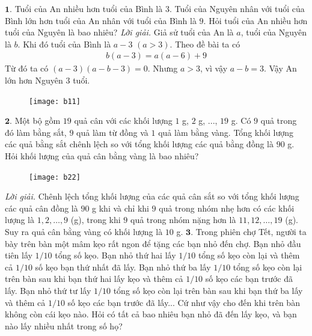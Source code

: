 \begin{multicols}{2}
$\pmb{1.}$ Tuổi của An nhiều hơn tuổi của Bình là $3$. Tuổi của Nguyên nhân với tuổi của Bình    lớn hơn   tuổi của An nhân với tuổi của Bình là  $9$. Hỏi tuổi của An nhiều hơn tuổi của Nguyên là bao nhiêu?
\vskip 0.1cm
\textit{Lời giải.} Giả sử tuổi của An là $a$, tuổi của Nguyên là $b$. Khi đó tuổi của Bình là $a - 3$ $(a>3)$. Theo đề bài ta có
\begin{align*}
	b(a-3) = a(a-6)+9
\end{align*}
Từ đó ta có $(a-3)(a-b-3)=0$.
\vskip 0.1cm
Nhưng $a>3$, vì vậy $a-b=3$. Vậy An lớn hơn Nguyên $3$ tuổi.
\begin{figure}[H]
	\centering
	\vspace*{-5pt}
	\captionsetup{labelformat= empty, justification=centering}
	\texttt{[image: b11]}
	\vspace*{-15pt}
\end{figure}
$\pmb{2.}$ Một bộ gồm $19$ quả cân với các khối lượng $1$ g, $2$ g, ..., $19$ g. Có $9$ quả trong đó làm bằng sắt, $9$ quả làm từ đồng và $1$ quả làm bằng vàng. Tổng khối lượng các quả bằng sắt \linebreak chênh lệch so với tổng khối lượng các quả bằng đồng là $90$ g. Hỏi khối lượng của quả cân bằng vàng là bao nhiêu?
\begin{figure}[H]
	\centering
	\vspace*{-5pt}
	\captionsetup{labelformat= empty, justification=centering}
	\texttt{[image: b22]}
	\vspace*{-15pt}
\end{figure}
\textit{Lời giải.} Chênh lệch tổng khối lượng của các quả cân sắt so với  tổng khối lượng các quả cân đồng là $90$ g khi và chỉ khi $9$ quả trong nhóm nhẹ hơn có các khối lượng là $1, 2, \ldots, 9$ (g), trong khi $9$ quả trong nhóm nặng hơn là $11, 12, \ldots, 19$ (g). Suy ra quả cân bằng vàng có khối lượng là $10$ g.
\vskip 0.1cm
$\pmb{3.}$ Trong phiên chợ Tết, người ta bày trên bàn một mâm kẹo rất ngon để tặng các bạn nhỏ đến chợ. Bạn nhỏ đầu tiên lấy $1/10$ tổng số kẹo. Bạn nhỏ thứ hai lấy $1/10$ tổng số kẹo còn lại và thêm cả $1/10$ số kẹo bạn thứ nhất đã lấy.  Bạn nhỏ thứ ba lấy $1/10$ tổng số kẹo còn lại trên bàn sau khi bạn thứ hai lấy kẹo và thêm cả $1/10$ số kẹo  các bạn trước đã lấy. Bạn nhỏ thứ tư lấy $1/10$ tổng số kẹo còn lại trên bàn sau khi bạn thứ ba lấy và thêm cả $1/10$ số kẹo các bạn trước đã lấy... Cứ như vậy cho đến khi trên bàn không còn cái kẹo nào. Hỏi có tất cả bao nhiêu bạn nhỏ đã đến lấy kẹo, và bạn nào lấy nhiều nhất trong số họ?

\end{multicols}
